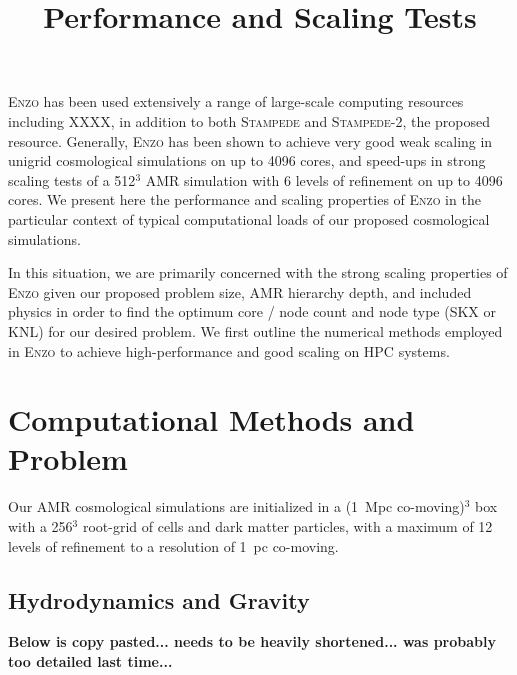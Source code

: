 \documentclass[12pt]{article} %
\title{\vspace{-5ex} Performance and Scaling Tests
       \vspace{-2ex}}
\begin{document}
 \thispagestyle{empty}


\maketitle

\textsc{Enzo} has been used extensively a range of large-scale computing resources including XXXX, in addition to both \textsc{Stampede} and \textsc{Stampede-2}, the proposed resource. Generally, \textsc{Enzo} has been shown to achieve very good weak scaling in unigrid cosmological simulations on up to 4096 cores, and speed-ups in strong scaling tests of a 512$^3$ AMR simulation with 6 levels of refinement on up to 4096 cores. We present here the performance and scaling properties of \textsc{Enzo} in the particular context of typical computational loads of our proposed cosmological simulations.

In this situation, we are primarily concerned with the strong scaling properties of \textsc{Enzo} given our proposed problem size, AMR hierarchy depth, and included physics in order to find the optimum core / node count and node type (SKX or KNL) for our desired problem. We first outline the numerical methods employed in \textsc{Enzo} to achieve high-performance and good scaling on HPC systems.

\section{Computational Methods and Problem}

Our AMR cosmological simulations are initialized in a (1~Mpc co-moving)$^3$ box with a 256$^3$ root-grid of cells and dark matter particles, with a maximum of 12 levels of refinement to a resolution of 1~pc co-moving.

\subsection{Hydrodynamics and Gravity}
\textbf{Below is copy pasted... needs to be heavily shortened... was probably too detailed last time...}
\end{document}
